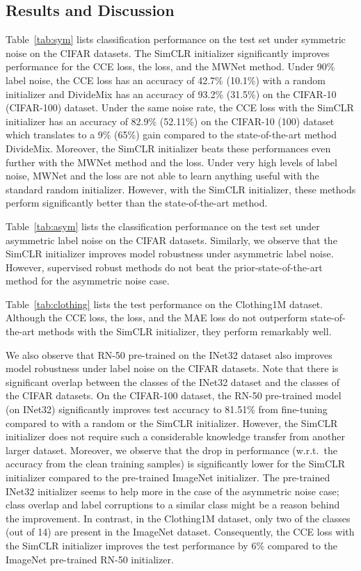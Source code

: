 \documentclass[final]{cvpr}
\begin{document}
\vspace{-0.1cm}
\subsection{Results and Discussion}
\vspace{-0.1cm}
Table~\ref{tab:sym} lists classification performance on the test set under symmetric noise on the CIFAR datasets. The SimCLR initializer significantly improves performance for the CCE loss, the  loss, and the MWNet method. 
Under 90\% label noise, the CCE loss has an accuracy of 42.7\% (10.1\%) with a random initializer and DivideMix has an accuracy of 93.2\% (31.5\%) on the CIFAR-10 (CIFAR-100) dataset. Under the same noise rate, the CCE loss with the SimCLR initializer has an accuracy of 82.9\% (52.11\%) on the CIFAR-10 (100) dataset which translates to a 9\% (65\%) gain compared to the state-of-the-art method DivideMix. 
Moreover, the SimCLR initializer beats these performances even further with the MWNet method and the  loss. Under very high levels of label noise, MWNet and the  loss are not able to learn anything useful with the standard random initializer. However, with the SimCLR initializer, these methods perform significantly better than the state-of-the-art method.



Table~\ref{tab:asym} lists the classification performance on the test set under asymmetric label noise on the CIFAR datasets. Similarly, we observe that the SimCLR initializer improves  model robustness under asymmetric label noise. However, supervised robust methods do not beat the prior-state-of-the-art method for the asymmetric noise case.

Table~\ref{tab:clothing} lists the test performance on the Clothing1M dataset. Although the CCE loss, the  loss, and the MAE loss do not outperform state-of-the-art methods with the SimCLR initializer, they perform remarkably well. 

We also observe that RN-50 pre-trained on the INet32 dataset also improves model robustness under label noise on the CIFAR datasets. Note that there is significant overlap between the classes of the INet32 dataset and the classes of the CIFAR datasets. On the CIFAR-100 dataset, the RN-50 pre-trained model (on INet32) significantly improves test accuracy to 81.51\% from fine-tuning compared to  with a random or the SimCLR initializer. 
However, the SimCLR initializer does not require such a considerable knowledge transfer from another larger dataset. Moreover, we observe that the drop in performance (w.r.t.\ the accuracy from the clean training samples) is significantly lower for the SimCLR initializer compared to the pre-trained ImageNet initializer. The pre-trained INet32 initializer seems to help more in the case of the asymmetric noise case; class overlap and label corruptions to a similar class might be a reason behind the improvement. In contrast, in the Clothing1M dataset, only two of the classes (out of 14) are present in the ImageNet dataset.
Consequently, the CCE loss with the SimCLR initializer improves the test performance by 6\% 
compared to the ImageNet pre-trained RN-50 initializer. 
\end{document}
